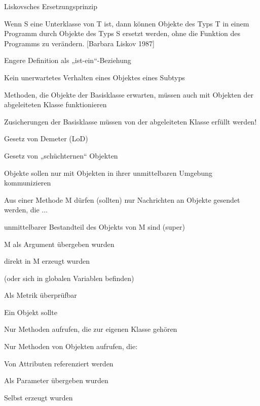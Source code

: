\documentclass[a4paper]{article}
\begin{document}
\begin{multicols}{3}
  Liskovsches Ersetzungsprinzip
  \begin{itemize*}
    \item Wenn S eine Unterklasse von T ist, dann können Objekte des Typs T in einem Programm durch Objekte des Typs S ersetzt werden, ohne die Funktion des Programms zu verändern. [Barbara Liskov 1987]
    \item Engere Definition als „ist-ein“-Beziehung
    \item Kein unerwartetes Verhalten eines Objektes eines Subtyps
    \item Methoden, die Objekte der Basisklasse erwarten, müssen auch mit Objekten der abgeleiteten Klasse funktionieren
    \item Zusicherungen der Basisklasse müssen von der abgeleiteten Klasse erfüllt werden!
  \end{itemize*}

  Gesetz von Demeter (LoD)
  \begin{itemize*}
    \item Gesetz von „schüchternen“ Objekten
    \item Objekte sollen nur mit Objekten in ihrer unmittelbaren Umgebung kommunizieren
    \item Aus einer Methode M dürfen (sollten) nur Nachrichten an Objekte gesendet werden, die ...
    \begin{itemize*}
      \item unmittelbarer Bestandteil des Objekts von M sind (super)
      \item M als Argument übergeben wurden
      \item direkt in M erzeugt wurden
      \item (oder sich in globalen Variablen befinden)
    \end{itemize*}
    \item Als Metrik überprüfbar
  \end{itemize*}

  Ein Objekt sollte
  \begin{itemize*}
    \item Nur Methoden aufrufen, die zur eigenen Klasse gehören
    \item Nur Methoden von Objekten aufrufen, die:
    \begin{itemize*}
      \item Von Attributen referenziert werden
      \item Als Parameter übergeben wurden
      \item Selbst erzeugt wurden
    \end{itemize*}
  \end{itemize*}



\end{multicols}
\end{document}
